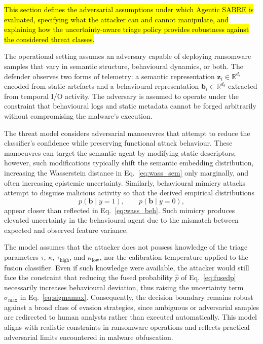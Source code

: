 \documentclass[3p]{elsarticle}
\begin{document}
\hl{This section defines the adversarial assumptions under which Agentic SABRE is evaluated,
specifying what the attacker can and cannot manipulate, and explaining how the uncertainty-aware
triage policy provides robustness against the considered threat classes.}

The operational setting assumes an adversary capable of deploying ransomware samples that vary in semantic structure, behavioural dynamics, or both. The defender observes two forms of telemetry: a semantic representation \(\mathbf{z}_i \in \mathbb{R}^{d_s}\) encoded from static artefacts and a behavioural representation \(\mathbf{b}_i \in \mathbb{R}^{d_b}\) extracted from temporal I/O activity. The adversary is assumed to operate under the constraint that behavioural logs and static metadata cannot be forged arbitrarily without compromising the malware’s execution.  

The threat model considers adversarial manoeuvres that attempt to reduce the classifier’s confidence while preserving functional attack behaviour. These manoeuvres can target the semantic agent by modifying static descriptors; however, such modifications typically shift the semantic embedding distribution, increasing the Wasserstein distance in Eq.~\eqref{eq:wass_sem} only marginally, and often increasing epistemic uncertainty. Similarly, behavioural mimicry attacks attempt to disguise malicious activity so that the derived empirical distributions
\begin{equation}
p(\mathbf{b}\mid y=1), \qquad  p(\mathbf{b}\mid y=0),
\label{eq:beh_dists}
\end{equation}
appear closer than reflected in Eq.~\eqref{eq:wass_beh}. Such mimicry produces elevated uncertainty in the behavioural agent due to the mismatch between expected and observed feature variance.

The model assumes that the attacker does not possess knowledge of the triage parameters \(\tau\), \(\kappa\), \(\tau_{\mathrm{high}}\), and \(\kappa_{\mathrm{low}}\), nor the calibration temperature applied to the fusion classifier. Even if such knowledge were available, the attacker would still face the constraint that reducing the fused probability \(\hat{p}\) of Eq.~\eqref{eq:fusedp} necessarily increases behavioural deviation, thus raising the uncertainty term \(\sigma_{\max}\) in Eq.~\eqref{eq:sigmamax}. Consequently, the decision boundary remains robust against a broad class of evasion strategies, since ambiguous or adversarial samples are redirected to human analysts rather than executed automatically. This model aligns with realistic constraints in ransomware operations and reflects practical adversarial limits encountered in malware obfuscation.
\end{document}
